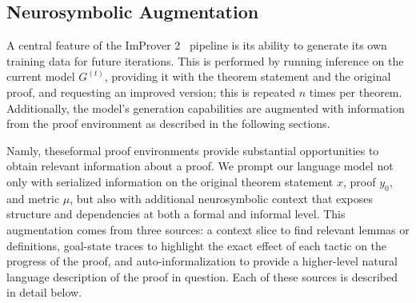 


\subsection{Neurosymbolic Augmentation}
\label{sec:generation}

A central feature of the ImProver 2 \ pipeline is its ability to generate its own training data for future iterations. This is performed by running inference on the current model $G^{(t)}$, providing it with the theorem statement and the original proof, and requesting an improved version; this is repeated $n$ times per theorem. Additionally, the model's generation capabilities are augmented with information from the proof environment as described in the following sections.


\label{sec:ns_aug}
Namly, theseformal proof environments provide substantial opportunities to obtain relevant information about a proof. We prompt our language model not only with serialized information on the original theorem statement $x$, proof $y_0$, and metric $\mu$, but also with additional neurosymbolic context that exposes structure and dependencies at both a formal and informal level. This augmentation comes from three sources: a context slice to find relevant lemmas or definitions, goal-state traces to highlight the exact effect of each tactic on the progress of the proof, and auto-informalization to provide a higher-level natural language description of the proof in question. Each of these sources is described in detail below. 



